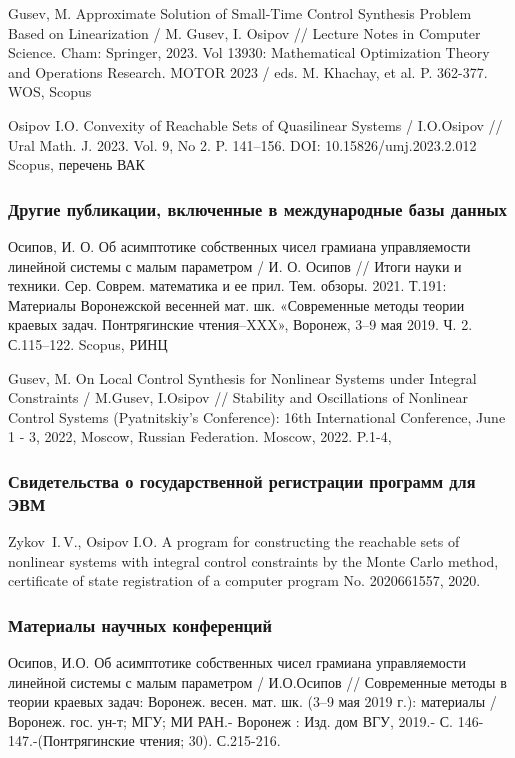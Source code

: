 \documentclass[../main.tex]{subfiles}
\begin{document}
\begin{thebibliography}{99}
     
     Gusev, M. 
     Approximate Solution of Small-Time Control Synthesis Problem Based on Linearization / 
     M. Gusev, I. Osipov // 
     Lecture Notes in Computer Science. Cham: Springer, 
     2023. Vol 13930: 
     Mathematical Optimization Theory and Operations Research. 
     MOTOR 2023 / eds. M. Khachay, et al.
     P. 362-377.
     WOS, Scopus
     
     Osipov I.O. 
     Convexity of Reachable Sets of Quasilinear Systems /
     I.O.Osipov // 
     Ural Math. J. 
     2023. Vol. 9, No 2. P. 141–156. 
     DOI: 10.15826/umj.2023.2.012
     Scopus, перечень ВАК

    
    \subsubsection*{Другие публикации, включенные в международные базы данных}
    Осипов, И. О. 
    Об асимптотике собственных чисел грамиана управляемости линейной системы с малым параметром / 
    И. О. Осипов // 
    Итоги науки и техники. Сер. Соврем. математика и ее прил. Тем. обзоры. 
    2021. Т.191: Материалы Воронежской весенней мат. шк. «Современные методы теории краевых задач. Понтрягинские чтения–XXX», 
    Воронеж, 3–9 мая 2019. Ч. 2. С.115–122. 
    Scopus, РИНЦ
    
    Gusev, M. 
    On Local Control Synthesis for Nonlinear Systems under Integral Constraints / 
    M.Gusev, I.Osipov // 
    Stability and Oscillations of Nonlinear Control Systems (Pyatnitskiy's Conference): 
    16th International Conference, 
    June 1 - 3, 2022, Moscow, Russian Federation. Moscow, 
    2022. P.1-4, 
    \subsubsection*{Свидетельства о государственной регистрации программ для ЭВМ}
    Zykov~I.\,V., Osipov I.O. A program for constructing the reachable sets of nonlinear systems with integral control constraints by the Monte Carlo method, certificate of state registration of a computer program No. 2020661557, 2020.
    \subsubsection*{Материалы научных конференций}
    
   Осипов, И.О. Об асимптотике собственных чисел грамиана управляемости линейной системы с малым параметром / И.О.Осипов // Современные методы в теории краевых задач: Воронеж. весен. мат. шк. (3–9 мая 2019 г.): материалы / Воронеж. гос. ун-т; МГУ; МИ РАН.- Воронеж : Изд. дом ВГУ, 2019.- С. 146-147.-(Понтрягинские чтения; 30). С.215-216. 
   

\end{thebibliography}
\end{document}
